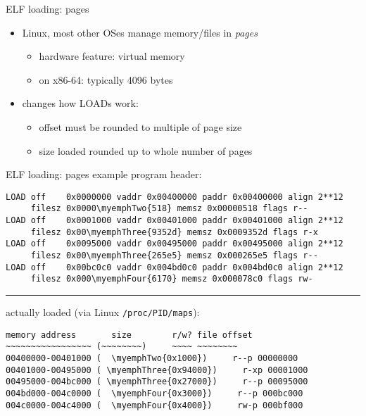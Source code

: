 


\begin{frame}{ELF loading: pages}
\begin{itemize}
    \item Linux, most other OSes manage memory/files in \textit{pages}
        \begin{itemize}
        \item hardware feature: virtual memory
        \item on x86-64: typically 4096 bytes
        \end{itemize}
    \item changes how LOADs work:
        \begin{itemize}
        \item offset must be rounded to multiple of page size
        \item size loaded rounded up to whole number of pages
        \end{itemize}
\end{itemize}
\end{frame}

\begin{frame}[fragile,label=ElfLoadPg]{ELF loading: pages example}
program header:
\begin{Verbatim}[fontsize=\small,commandchars=\\\{\}]
LOAD off    0x0000000 vaddr 0x00400000 paddr 0x00400000 align 2**12
     filesz 0x0000\myemphTwo{518} memsz 0x00000518 flags r--
LOAD off    0x0001000 vaddr 0x00401000 paddr 0x00401000 align 2**12
     filesz 0x00\myemphThree{9352d} memsz 0x0009352d flags r-x
LOAD off    0x0095000 vaddr 0x00495000 paddr 0x00495000 align 2**12
     filesz 0x00\myemphThree{265e5} memsz 0x000265e5 flags r--
LOAD off    0x00bc0c0 vaddr 0x004bd0c0 paddr 0x004bd0c0 align 2**12
     filesz 0x000\myemphFour{6170} memsz 0x000078c0 flags rw-
\end{Verbatim}
\hrule
actually loaded (via Linux \texttt{/proc/PID/maps}):
\begin{Verbatim}[fontsize=\small,commandchars=\\\{\}]
memory address       size        r/w? file offset
~~~~~~~~~~~~~~~~~ (~~~~~~~~)     ~~~~ ~~~~~~~~ 
00400000-00401000 (  \myemphTwo{0x1000})     r--p 00000000
00401000-00495000 ( \myemphThree{0x94000})     r-xp 00001000
00495000-004bc000 ( \myemphThree{0x27000})     r--p 00095000
004bd000-004c0000 (  \myemphFour{0x3000})     r--p 000bc000
004c0000-004c4000 (  \myemphFour{0x4000})     rw-p 000bf000
\end{Verbatim}
\end{frame}
